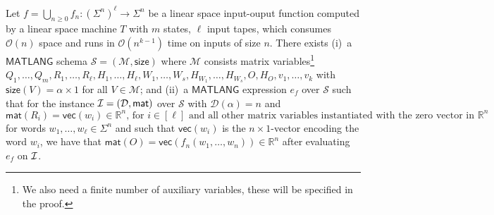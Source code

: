 \begin{proposition} \label{prop:transducer}
Let $f=\bigcup_{n\geq 0}f_n:(\Sigma^n)^\ell\to \Sigma^n$ be a linear space input-ouput function 
computed by a linear space  machine $T$ with $m$ states, $\ell$ input tapes, which consumes 
$\mathcal{O}(n)$ space and runs in $\mathcal{O}(n^{k-1})$ time on inputs of size $n$. 
There exists (i)~a $\mathsf{MATLANG}$ 
schema $\mathcal{S}=(\mathcal{M},\textsf{size})$ where $\mathcal{M}$ consists matrix 
variables\footnote{We also need a finite number of auxiliary variables, these will be specified 
in the proof.} 
$Q_1,\ldots,Q_m,R_1,\ldots,R_\ell,H_1,\ldots,H_\ell,W_1,\ldots,W_s,H_{W_1},\ldots,H_{W_s},O,H_O, v_1,\ldots,v_{k}$ 
with $\mathsf{size}(V)=\alpha\times 1$ for all $V\in\mathcal{M}$; and (ii)~a $\mathsf{MATLANG}$ 
expression $e_f$ over $\mathcal{S}$ such that for the instance 
$\mathcal{I}=(\mathcal{D},\textsf{mat})$ over $\mathcal{S}$ with $\mathcal{D}(\alpha)=n$ and 
$$\mathsf{mat}(R_i)=\mathsf{vec}(w_i)\in \mathbb{R}^n\text{, for $i\in[\ell]$ and all other matrix variables instantiated with the zero vector in $\mathbb{R}^n$} $$
for words $w_1,\ldots,w_\ell\in\Sigma^n$ and such that $\mathsf{vec}(w_i)$ is the $n\times 1$-vector 
encoding the word $w_i$, we have that  $\mathsf{mat}(O)=\mathsf{vec}(f_n(w_1,\ldots,w_n))\in\mathbb{R}^n$ 
after evaluating $e_f$ on $\mathcal{I}$.
\end{proposition}
